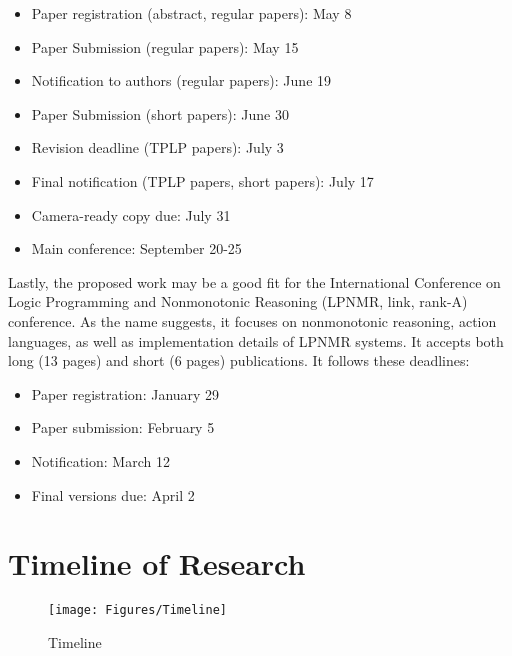 \begin{itemize}
    \item Paper registration (abstract, regular papers): May 8
    \item Paper Submission (regular papers): May 15
    \item Notification to authors (regular papers): June 19
    \item Paper Submission (short papers): June 30
    \item Revision deadline (TPLP papers): July 3
    \item Final notification (TPLP papers, short papers): July 17
    \item Camera-ready copy due: July 31
    \item Main conference: September 20-25
\end{itemize}

Lastly, the proposed work may be a good fit for the International Conference on Logic Programming and Nonmonotonic Reasoning (LPNMR, link, rank-A) conference.
As the name suggests, it focuses on nonmonotonic reasoning, action languages, as well as implementation details of LPNMR systems.
It accepts both long (13 pages) and short (6 pages) publications.
It follows these deadlines:

\begin{itemize}
    \item Paper registration: January 29
    \item Paper submission: February 5
    \item Notification: March 12
    \item Final versions due: April 2
\end{itemize}

\section{Timeline of Research}

\begin{figure}[h]
    \centering
    \texttt{[image: Figures/Timeline]}
    \caption{Timeline}
    \label{fig:timeline}
\end{figure}
